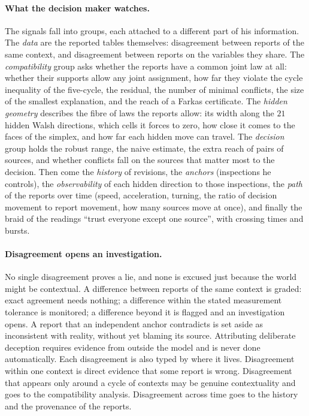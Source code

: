 \documentclass[11pt]{article}
\theoremstyle{definition}\newtheorem{definition}[theorem]{Definition}\newtheorem{remark}[theorem]{Remark}\newtheorem{example}[theorem]{Example}\newtheorem{problem}[theorem]{Open problem}\crefname{problem}{Problem}{Problems}
\begin{document}
\paragraph{What the decision maker watches.} The signals fall into groups, each attached to a different part of his information. The \emph{data} are the reported tables themselves: disagreement between reports of the same context, and disagreement between reports on the variables they share. The \emph{compatibility} group asks whether the reports have a common joint law at all: whether their supports allow any joint assignment, how far they violate the cycle inequality of the five-cycle, the residual, the number of minimal conflicts, the size of the smallest explanation, and the reach of a Farkas certificate. The \emph{hidden geometry} describes the fibre of laws the reports allow: its width along the $21$ hidden Walsh directions, which cells it forces to zero, how close it comes to the faces of the simplex, and how far each hidden move can travel. The \emph{decision} group holds the robust range, the naive estimate, the extra reach of pairs of sources, and whether conflicts fall on the sources that matter most to the decision. Then come the \emph{history} of revisions, the \emph{anchors} (inspections he controls), the \emph{observability} of each hidden direction to those inspections, the \emph{path} of the reports over time (speed, acceleration, turning, the ratio of decision movement to report movement, how many sources move at once), and finally the braid of the readings ``trust everyone except one source'', with crossing times and bursts.

\paragraph{Disagreement opens an investigation.} No single disagreement proves a lie, and none is excused just because the world might be contextual. A difference between reports of the same context is graded: exact agreement needs nothing; a difference within the stated measurement tolerance is monitored; a difference beyond it is flagged and an investigation opens. A report that an independent anchor contradicts is set aside as inconsistent with reality, without yet blaming its source. Attributing deliberate deception requires evidence from outside the model and is never done automatically. Each disagreement is also typed by where it lives. Disagreement within one context is direct evidence that some report is wrong. Disagreement that appears only around a cycle of contexts may be genuine contextuality and goes to the compatibility analysis. Disagreement across time goes to the history and the provenance of the reports.
\end{document}
